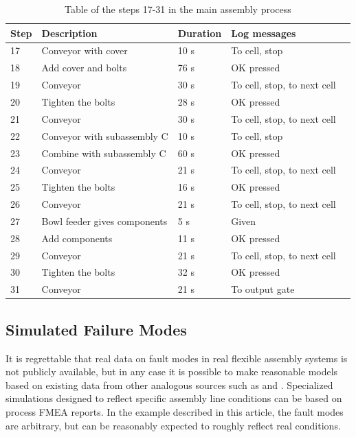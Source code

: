 \documentclass[journal]{IEEEtran}
\begin{document}
\begin{table}[!t]
\renewcommand{\arraystretch}{1.3}
\caption{Table of the steps 17-31 in the main assembly process}
\label{mainsteps2}
\centering
\begin{tabular}{|p{5mm}|p{20mm}|p{10mm}|p{15mm}|p{15mm}|}
\hline
Step & Description & Duration & Log messages \\
\hline
\hline
17 & Conveyor with cover & 10 s & To cell, stop \\
\hline
18 & Add cover and bolts & 76 s & OK pressed \\
\hline
19 & Conveyor & 30 s & To cell, stop, to next cell \\
\hline
20 & Tighten the bolts & 28 s & OK pressed \\
\hline
21 & Conveyor & 30 s & To cell, stop, to next cell \\
\hline
22 & Conveyor with subassembly C & 10 s & To cell, stop \\
\hline
23 & Combine with subassembly C & 60 s & OK pressed \\
\hline
24 & Conveyor & 21 s & To cell, stop, to next cell \\
\hline
25 & Tighten the bolts & 16 s & OK pressed \\
\hline
26 & Conveyor & 21 s & To cell, stop, to next cell \\
\hline
27 & Bowl feeder gives components & 5 s & Given \\
\hline
28 & Add components & 11 s & OK pressed \\
\hline
29 & Conveyor & 21 s & To cell, stop, to next cell \\
\hline
30 & Tighten the bolts & 32 s & OK pressed \\
\hline
31 & Conveyor & 21 s & To output gate \\
\hline
\end{tabular}
\end{table}

\subsection{Simulated Failure Modes}
It is regrettable that real data on fault modes in real flexible assembly systems is not publicly available, but in any case it is possible to make reasonable
models based on existing data from other analogous sources such as \cite{nasaames} and \cite{tsarouhas2009classification}. Specialized simulations designed
to reflect specific assembly line conditions can be based on process FMEA reports. In the example described in this article, the fault modes are arbitrary, but 
can be reasonably expected to roughly reflect real conditions.
\end{document}
